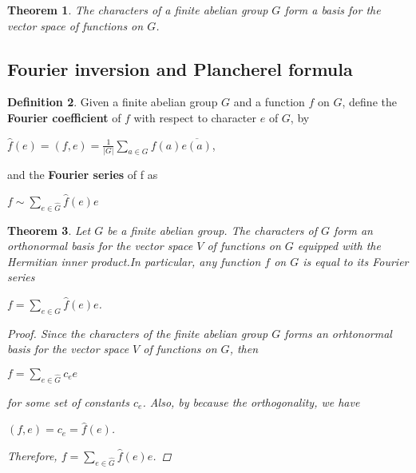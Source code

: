\documentclass[psamsfonts]{amsart}
\newtheorem{thm}{Theorem}[section]
\theoremstyle{definition}
\newtheorem{defn}[thm]{Definition}
\theoremstyle{remark}
\numberwithin{equation}{section}
\begin{document}
			\begin{thm}
				The characters of a finite abelian group $G$ form a basis for the vector space of functions on $G$.
			\end{thm}
			
		\subsection{Fourier inversion and Plancherel formula}
			\begin{defn}
				Given a finite abelian group $G$ and a function $f$ on $G$, define the \textbf{Fourier coefficient} of $f$ with respect to character $e$ of $G$, by\\
				\begin{center}
					$\hat{f}(e) = (f,e) = \frac{1}{|G|} \sum_{a \in G} f(a)\overline{e(a)}$,
				\end{center}
				\vspace{2mm}
				and the \textbf{Fourier series} of f as\\
				\begin{center}
					$f \sim \sum_{e \in \hat{G}} \hat{f}(e)e$
				\end{center}
			\end{defn}
			\vspace{2mm}
			\begin{thm}
				Let $G$ be a finite abelian group. The characters of $G$ form an orthonormal basis for the vector space $V$ of functions on $G$ equipped with the Hermitian inner product.In particular, any function $f$ on $G$ is equal to its Fourier series\\
				\begin{center}
					$f = \sum_{e \in G} \hat{f}(e)e$.
				\end{center}
				
				\begin{proof}
					Since the characters of the finite abelian group $G$ forms an orhtonormal basis for the vector space $V$ of functions on $G$, then\\
					\begin{center}
						$f = \sum_{e \in \hat{G}} c_ee$
					\end{center}
					\vspace{2mm}
					for some set of constants $c_e$. Also, by because the orthogonality, we have\\
					\begin{center}
						$(f,e) = c_e = \hat{f}(e)$.
					\end{center}
					\vspace{2mm}
					Therefore, $f = \sum_{e \in \hat{G}} \hat{f}(e) e$.
				\end{proof}
			\end{thm}
			
\end{document}
